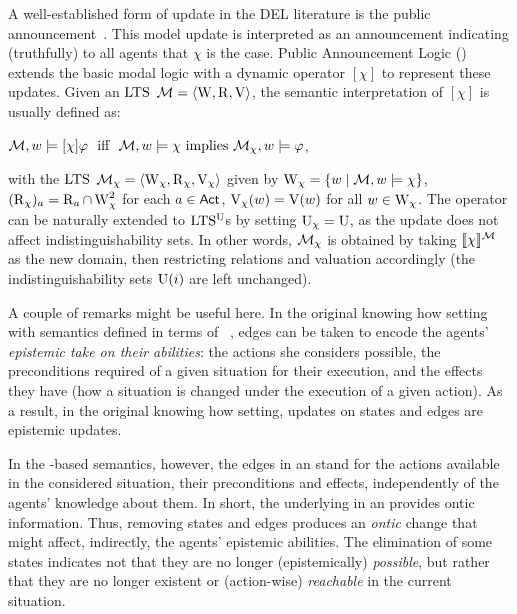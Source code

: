 

A well-established form of update in the DEL literature is the public announcement~\cite{Plaza89:lopc,DELbook}. This model update is interpreted as an announcement indicating (truthfully) to all agents that $\chi$ is the case.
Public Announcement Logic (\PAL) extends the basic modal logic with a dynamic operator $[\chi]$ to represent these updates. Given an $\textup{LTS}$ $\mathcal{M}=\langle \operatorname{W},\operatorname{R},\operatorname{V} \rangle$, the semantic interpretation of $[\chi]$ is usually defined as: 
\begin{spcenter}
  $\modults,w\models[\chi]\varphi \ \ \text{iff} \ \  \modults,w\models\chi \mbox{ implies } \modults_{\chi},w\models\varphi$,
\end{spcenter}
with the $\textup{LTS}$ $\mathcal{M}_\chi=\langle \operatorname{W}_\chi,\operatorname{R}_\chi,\operatorname{V}_\chi \rangle$ given by $\operatorname{W}_\chi = \{ w \mid \mathcal{M},w\models\chi \}$, $(\operatorname{R}_\chi)_a = \operatorname{R}_a \cap \operatorname{W}_\chi^2$ for each $a\in{\rm \sf Act}$, $\operatorname{V}_\chi(w) = \operatorname{V}(w)$ for all $w\in\operatorname{W}_\chi$.  The operator can be naturally extended to 
$\textup{LTS$^\text{\textup{U}}$}$s by setting $\operatorname{U}_\chi = {\operatorname{U}}$, as the update does not affect indistinguishability sets. 
In other words, $\mathcal{M}_\chi$ is obtained by taking $\llbracket \chi \rrbracket^{\mathcal{M}}$ as the new domain, then restricting relations and valuation accordingly (the indistinguishability sets $\operatorname{U}(i)$ are left unchanged). 

\begin{mrevised}
A couple of remarks might be useful here. In the original knowing how setting with semantics defined in terms of ~\cite{Wang2016}, edges can be taken to encode the agents' \emph{epistemic take on their abilities}: the actions she considers possible, the preconditions required of a given situation for their execution, and the effects they have (how a situation is changed under the execution of a given action). As a result, in the original knowing how setting, updates on states and edges are epistemic updates.


In the \ults-based semantics, however, the edges in an \ults stand for the actions available in the considered situation, their preconditions
and effects, independently of the agents' knowledge about them. In short, the 
underlying \lts in an \ults provides ontic information. Thus, removing states and edges produces an \emph{ontic} change that might affect, indirectly, the agents' epistemic abilities.  The elimination of some states indicates not that they are no longer (epistemically) \emph{possible}, but rather that they are no longer existent or (action-wise) \emph{reachable} in the current situation. 
\end{mrevised}

